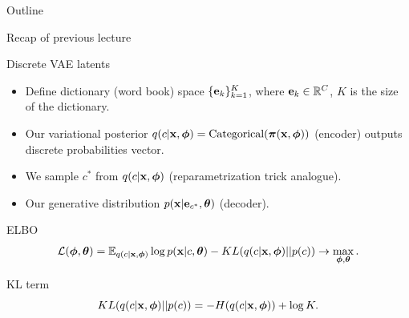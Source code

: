 

\usepackage{tikz}

\usetikzlibrary{arrows,shapes,positioning,shadows,trees}

\begin{frame}
\titlepage
\end{frame}
\begin{frame}{Outline}
	\tableofcontents
\end{frame}
\begin{frame}{Recap of previous lecture}
	\begin{block}{Discrete VAE latents}
		\begin{itemize}
			\item Define dictionary (word book) space $\{\mathbf{e}_k\}_{k=1}^K$, where $\mathbf{e}_k \in \mathbb{R}^C$, $K$ is the size of the dictionary.
			\item Our variational posterior $q(c | \mathbf{x}, \boldsymbol{\phi}) = \text{Categorical}(\boldsymbol{\pi}(\mathbf{x}, \boldsymbol{\phi}))$ (encoder) outputs discrete probabilities vector.
			\item We sample $c^*$ from $q(c | \mathbf{x}, \boldsymbol{\phi})$ (reparametrization trick analogue).
			\item Our generative distribution $p(\mathbf{x} | \mathbf{e}_{c^*}, \boldsymbol{\theta})$ (decoder).
		\end{itemize}
	\end{block}
	\begin{block}{ELBO}
		\vspace{-0.5cm}
		\[
			\mathcal{L} (\boldsymbol{\phi}, \boldsymbol{\theta})  = \mathbb{E}_{q(c | \mathbf{x}, \boldsymbol{\phi})} \log p(\mathbf{x} | c, \boldsymbol{\theta}) - KL(q(c| \mathbf{x}, \boldsymbol{\phi}) || p(c)) \rightarrow \max_{\boldsymbol{\phi}, \boldsymbol{\theta}}.
		\]
		\vspace{-0.5cm}
	\end{block}
	\begin{block}{KL term}
		\vspace{-0.4cm}
		\[
			KL(q(c| \mathbf{x}, \boldsymbol{\phi}) || p(c)) = - H(q(c | \mathbf{x}, \boldsymbol{\phi})) + \log K. 
		\]
	\end{block}
\end{frame}
